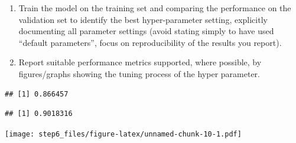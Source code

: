 \documentclass[sigchi]{acmart}
\newenvironment{Shaded}{\begin{snugshade}}{\end{snugshade}}
\newcommand{\CommentTok}[1]{\textcolor[rgb]{0.56,0.35,0.01}{\textit{#1}}}
\newcommand{\KeywordTok}[1]{\textcolor[rgb]{0.13,0.29,0.53}{\textbf{#1}}}
\newcommand{\NormalTok}[1]{#1}
\newcommand{\OperatorTok}[1]{\textcolor[rgb]{0.81,0.36,0.00}{\textbf{#1}}}
\begin{document}
\begin{enumerate}
\def\labelenumi{\alph{enumi}.}
\setcounter{enumi}{3}
\item
  Train the model on the training set and comparing the performance on the validation set to identify the best hyper-parameter setting, explicitly documenting all parameter settings (avoid stating simply to have used ``default parameters'', focus on reproducibility of the results you report).
\item
  Report suitable performance metrics supported, where possible, by figures/graphs showing the tuning process of the hyper parameter.
\end{enumerate}

\begin{Shaded}
\end{Shaded}

\begin{verbatim}
## [1] 0.866457
\end{verbatim}

\begin{Shaded}
\end{Shaded}

\begin{verbatim}
## [1] 0.9018316
\end{verbatim}

\begin{Shaded}
\end{Shaded}

\texttt{[image: step6\_files/figure-latex/unnamed-chunk-10-1.pdf]}

\begin{Shaded}
\end{Shaded}
\end{document}
